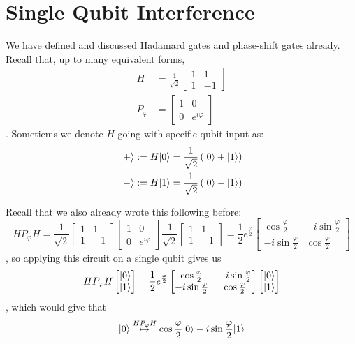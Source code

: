 \documentclass[12pt]{article}
\begin{document}
\section{Single Qubit Interference}
We have defined and discussed Hadamard gates and phase-shift gates already. Recall that, up to many equivalent forms, $$
\begin{aligned}
H
    &= \frac{1}{\sqrt{2}}\begin{bmatrix}
    1 & 1\\
    1 & -1
    \end{bmatrix}\\
P_\varphi
    &= \begin{bmatrix}
        1 & 0\\
        0 & e^{i\varphi}
    \end{bmatrix}
\end{aligned}
$$. Sometiems we denote $H$ going with specific qubit input as:$$
\begin{aligned}
\Ket{+} &:= H\Ket{0} = \frac{1}{\sqrt{2}}\prt{\Ket{0} + \Ket{1}}\\
\Ket{-} &:= H\Ket{1} = \frac{1}{\sqrt{2}}\prt{\Ket{0} - \Ket{1}}
\end{aligned}
$$

Recall that we also already wrote this following before: $$
HP_\varphi H = \frac{1}{\sqrt{2}}\begin{bmatrix}
    1 & 1\\
    1 & -1
    \end{bmatrix}\begin{bmatrix}
        1 & 0\\
        0 & e^{i\varphi}
    \end{bmatrix}\frac{1}{\sqrt{2}}\begin{bmatrix}
    1 & 1\\
    1 & -1
    \end{bmatrix} = \frac{1}{2}e^{\frac{\varphi}{2}}\begin{bmatrix}
        \cos\frac{\varphi}{2} & -i\sin\frac{\varphi}{2}\\
        -i\sin\frac{\varphi}{2} & \cos\frac{\varphi}{2}
    \end{bmatrix}
$$, so applying this circuit on a single qubit gives us $$
HP_\varphi H \begin{bmatrix}
    \Ket{0}\\
    \Ket{1}
\end{bmatrix} = \frac{1}{2}e^{\frac{\varphi}{2}}\begin{bmatrix}
    \cos\frac{\varphi}{2} & -i\sin\frac{\varphi}{2}\\
    -i\sin\frac{\varphi}{2} & \cos\frac{\varphi}{2}
\end{bmatrix}\begin{bmatrix}
    \Ket{0}\\
    \Ket{1}
\end{bmatrix}
$$, which would give that $$
\Ket{0} \overset{HP_\varphi H}{\mapsto} \cos\frac{\varphi}{2}\Ket{0} - i\sin\frac{\varphi}{2}\Ket{1}
$$
\end{document}

